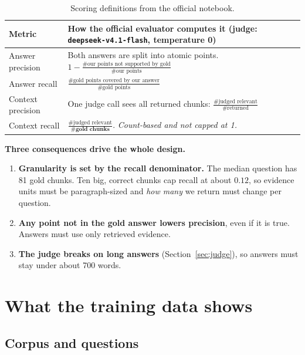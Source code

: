\documentclass[10pt,a4paper]{article}
\begin{document}
\begin{table}[h]
\centering\small
\begin{tabularx}{\linewidth}{@{}lX@{}}
\toprule
\textbf{Metric} & \textbf{How the official evaluator computes it (judge: \texttt{deepseek-v4.1-flash}, temperature 0)} \\
\midrule
Answer precision & Both answers are split into atomic points. $1 - \frac{\#\text{our points not supported by gold}}{\#\text{our points}}$ \\
Answer recall & $\frac{\#\text{gold points covered by our answer}}{\#\text{gold points}}$ \\
Context precision & One judge call sees all returned chunks: $\frac{\#\text{judged relevant}}{\#\text{returned}}$ \\
Context recall & $\frac{\#\text{judged relevant}}{\#\textbf{gold chunks}}$. \emph{Count-based and not capped at 1.} \\
\bottomrule
\end{tabularx}
\caption{Scoring definitions from the official notebook.}
\label{tab:metrics}
\end{table}

\textbf{Three consequences drive the whole design.}
\begin{enumerate}
\item \textbf{Granularity is set by the recall denominator.} The median question has 81 gold chunks. Ten big, correct chunks cap recall at about $0.12$, so evidence units must be paragraph-sized and \emph{how many} we return must change per question.
\item \textbf{Any point not in the gold answer lowers precision}, even if it is true. Answers must use only retrieved evidence.
\item \textbf{The judge breaks on long answers} (Section~\ref{sec:judge}), so answers must stay under about 700 words.
\end{enumerate}

\section{What the training data shows}

\subsection{Corpus and questions}
\end{document}
